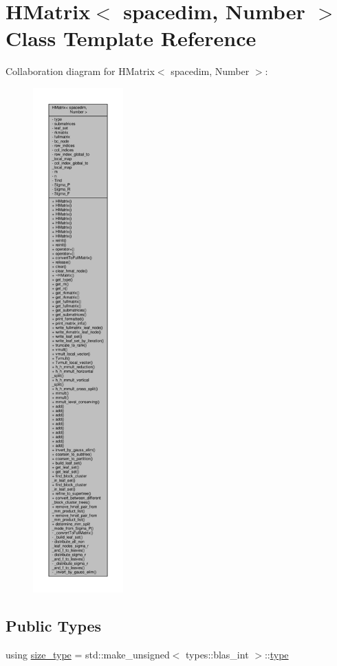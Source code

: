 \hypertarget{classHMatrix}{}\section{H\+Matrix$<$ spacedim, Number $>$ Class Template Reference}
\label{classHMatrix}


Collaboration diagram for H\+Matrix$<$ spacedim, Number $>$\+:
\nopagebreak
\begin{figure}[H]
\begin{center}
\leavevmode
\includegraphics[height=550pt]{classHMatrix__coll__graph}
\end{center}
\end{figure}
\subsection*{Public Types}
\begin{DoxyCompactItemize}
\item 
using \hyperlink{classHMatrix_a5ca8dc549783d38371a01ecd621ecb34}{size\+\_\+type} = std\+::make\+\_\+unsigned$<$ types\+::blas\+\_\+int $>$\+::\hyperlink{classHMatrix_a89ef60f3ba737c04708195ca0bb13620}{type}
\end{DoxyCompactItemize}
